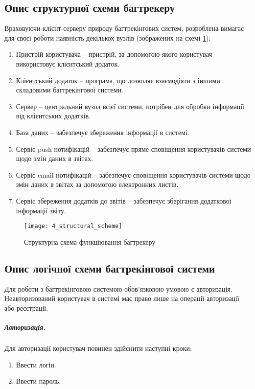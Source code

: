 \documentclass[../main.tex]{subfiles}
\begin{document}
	\subsection{Опис структурної схеми багтрекеру}
		Враховуючи клієнт-серверу природу багтрекінгових систем, розроблена вимагає для своєї роботи наявність декількох вузлів (зображених на схемі \ref{structural_scheme}):
		\begin{enumerate}
			\item Пристрій користувача -- пристрій, за допомогою якого користувач використовує клієнтський додаток.
			\item Клієнтський додаток -- програма, що дозволяє взаємодіяти з іншими складовими багтрекінгової системи.
			\item Сервер -- центральний вузол всієї системи, потрібен для обробки інформації від клієнтських додатків.
			\item База даних -- забезпечує збереження інформації в системі.
			\item Сервіс push нотифікацій -- забезпечує пряме сповіщення користувачів системи щодо змін даних в звітах.
			\item Сервіс email нотифікацій -- забезпечує сповіщення користувачів системи щодо змін даних в звітах за допомогою електронних листів.
			\item Сервіс збереження додатків до звітів -- забезпечує зберігання додаткової інформації звіту.
		\end{enumerate}
		
		\begin{figure}[H]
			\centering
			\texttt{[image: 4\_structural\_scheme]}
			\caption{Структурна схема функціювання багтрекеру}
			\label{structural_scheme}
		\end{figure}
	
	\subsection{Опис логічної схеми багтрекінгової системи}
		Для роботи з багтрекінговою системою обов'язковою умовою є авторизація. Неавторизований користувач в системі має право лише на операції авторизації або реєстрації.
		
		\subparagraph{Авторизація.}
			Для авторизації користувач повинен здійснити наступні кроки:
			\begin{enumerate}
				\item Ввести логін.
				\item Ввести пароль.
			\end{enumerate}
			
\end{document}
